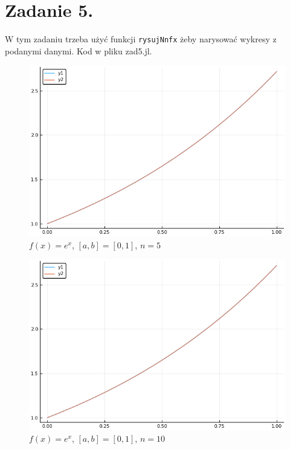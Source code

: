 \documentclass{article}
\begin{document}
\section{Zadanie 5.}
W tym zadaniu trzeba użyć funkcji \verb|rysujNnfx| żeby narysować wykresy z podanymi danymi.
Kod w pliku zad5.jl.
\begin{figure}[H]
	\includegraphics[width=\linewidth]{zad5a_5.png}
	\caption{$f(x) = e^x$, $[a,b]=[0,1]$, $n=5$}
	\label{fig:5a5}
\end{figure}
\begin{figure}[H]
	\includegraphics[width=\linewidth]{zad5a_10.png}
	\caption{$f(x) = e^x$, $[a,b]=[0,1]$, $n=10$}
	\label{fig:5a5}
\end{figure}
\end{document}
